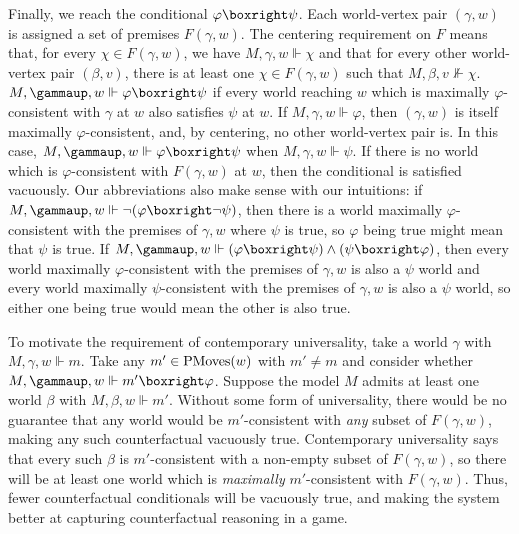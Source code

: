 \documentclass{article}
\begin{document}
Finally, we reach the conditional $\varphi\boxright\psi$. Each world-vertex pair $(\gamma,w)$ is assigned a set of premises $F(\gamma,w)$. The centering requirement on $F$ means that, for every $\chi\in F(\gamma,w)$, we have $M,\gamma,w\Vdash\chi$ and that for every other world-vertex pair $(\beta,v)$, there is at least one $\chi\in F(\gamma,w)$ such that $M,\beta,v\not\Vdash\chi$. $M,\gamma,w\Vdash \varphi\boxright\psi$ if every world reaching $w$ which is maximally $\varphi$-consistent with $\gamma$ at $w$ also satisfies $\psi$ at $w$.
If $M,\gamma,w\Vdash\varphi$, then $(\gamma,w)$ is itself maximally $\varphi$-consistent, and, by centering, no other world-vertex pair is. In this case, $M,\gamma,w\Vdash\varphi\boxright\psi$ when $M,\gamma,w\Vdash\psi$. If there is no world which is $\varphi$-consistent with $F(\gamma,w)$ at $w$, then the conditional is satisfied vacuously. Our abbreviations also make sense with our intuitions: if $M,\gamma,w\Vdash\lnot(\varphi\boxright\lnot\psi)$, then there is a world maximally $\varphi$-consistent with the premises of $\gamma,w$ where $\psi$ is true, so $\varphi$ being true might mean that $\psi$ is true. If $M,\gamma,w\Vdash(\varphi\boxright\psi)\land(\psi\boxright\varphi)$, then every world maximally $\varphi$-consistent with the premises of $\gamma,w$ is also a $\psi$ world and every world maximally $\psi$-consistent with the premises of $\gamma,w$ is also a $\psi$ world, so either one being true would mean the other is also true.

To motivate the requirement of contemporary universality, take a world $\gamma$ with $M,\gamma,w\Vdash m$. Take any $m'\in\text{PMoves}(w)$ with $m'\ne m$ and consider whether $M,\gamma,w\Vdash m'\boxright\varphi$. Suppose the model $M$ admits at least one world $\beta$ with $M,\beta,w\Vdash m'$. Without some form of universality, there would be no guarantee that any world would be $m'$-consistent with \textit{any} subset of $F(\gamma,w)$, making any such counterfactual vacuously true. Contemporary universality says that every such $\beta$ is $m'$-consistent with a non-empty subset of $F(\gamma,w)$, so there will be at least one world which is \textit{maximally} $m'$-consistent with $F(\gamma,w)$. Thus, fewer counterfactual conditionals will be vacuously true, and making the system better at capturing counterfactual reasoning in a game.
\end{document}
